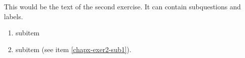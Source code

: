 This would be the text of the second exercise. It can contain subquestions and labels. 
\begin{enumerate}
\item{subitem\label{chapx-exer2-sub1}}
\item{subitem (see item \ref{chapx-exer2-sub1}).\label{chapx-exer2-sub2}}
\end{enumerate}